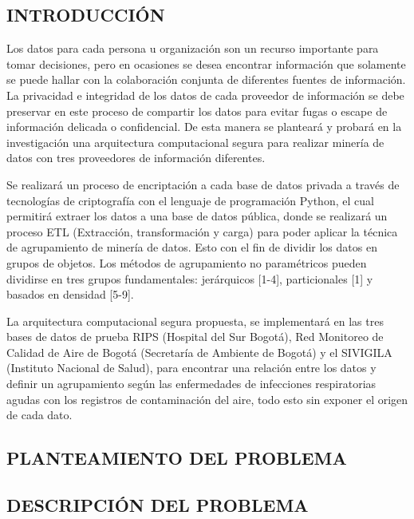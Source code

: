 \documentclass[a4paper, 11pt, oneside]{article}
\theoremstyle{definition}
\theoremstyle{remark}
\begin{document}
\begin{center}
 \section{INTRODUCCIÓN}
 \end{center}
 
 Los datos para cada persona u organización son un recurso importante para tomar decisiones, pero  en ocasiones se desea encontrar información que solamente se puede hallar con la colaboración conjunta de diferentes fuentes de información. La privacidad e integridad de los datos de cada proveedor de información se debe preservar en este proceso de compartir los datos para evitar fugas o escape de información delicada o confidencial. De esta manera se planteará y probará en la investigación una arquitectura computacional segura para realizar minería de datos con tres proveedores de información diferentes.

Se realizará un proceso de encriptación a cada base de datos privada a través de tecnologías de criptografía con el lenguaje de programación Python, el cual permitirá extraer los datos a una base de datos pública, donde se realizará un proceso ETL (Extracción, transformación y carga) para poder aplicar la técnica de agrupamiento de minería de datos. Esto con el fin de dividir los datos en grupos de objetos. Los métodos de agrupamiento no paramétricos pueden dividirse en tres grupos fundamentales: jerárquicos [1-4], particionales [1] y basados en densidad [5-9].

La arquitectura computacional segura propuesta, se implementará en las tres bases de datos de prueba RIPS (Hospital del Sur Bogotá), Red Monitoreo de Calidad de Aire de Bogotá (Secretaría de Ambiente de Bogotá) y el SIVIGILA (Instituto Nacional de Salud), para encontrar una relación entre los datos y definir un agrupamiento según las enfermedades de infecciones respiratorias agudas con los registros de contaminación del aire, todo esto sin exponer el origen de cada dato.

\clearpage

\begin{center}
 \section{PLANTEAMIENTO DEL PROBLEMA}
 \end{center}

\subsection{DESCRIPCIÓN DEL PROBLEMA}
\end{document}
